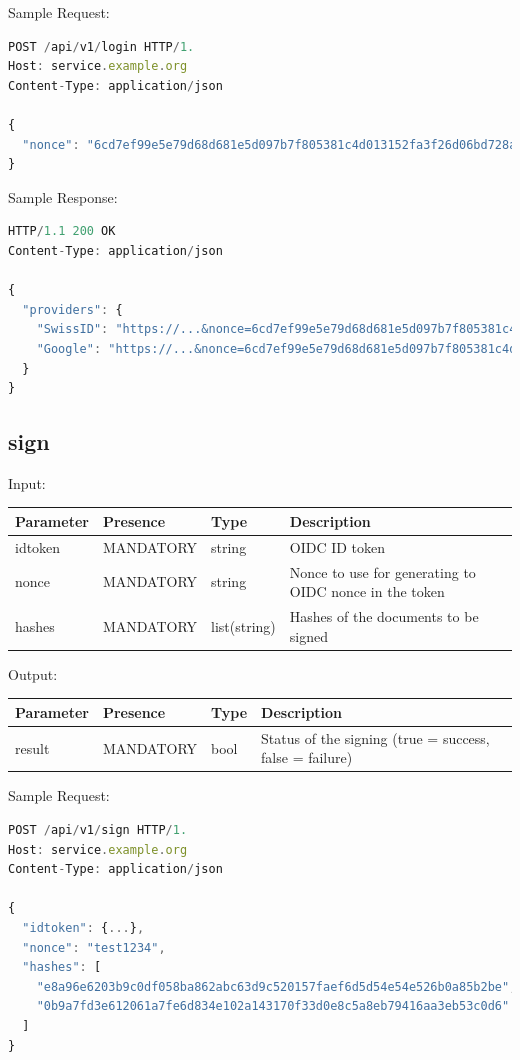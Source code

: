Sample Request:
\begin{lstlisting}[caption={login request}, captionpos=b, language=JavaScript, label={lst:loginrequest}]
POST /api/v1/login HTTP/1.
Host: service.example.org
Content-Type: application/json

{
  "nonce": "6cd7ef99e5e79d68d681e5d097b7f805381c4d013152fa3f26d06bd728ae49fa"
}
\end{lstlisting}

Sample Response:

\begin{lstlisting}[caption={login response}, captionpos=b, language=JavaScript, label={lst:loginresponse}]
HTTP/1.1 200 OK
Content-Type: application/json

{
  "providers": {
    "SwissID": "https://...&nonce=6cd7ef99e5e79d68d681e5d097b7f805381c4d013152fa3f26d06bd728ae49fa",
    "Google": "https://...&nonce=6cd7ef99e5e79d68d681e5d097b7f805381c4d013152fa3f26d06bd728ae49fa"
  }
}
\end{lstlisting}

\subsection{sign}
Input:

\begin{tabular}{|l|l|l|l|}
	\hline
	Parameter & Presence & Type & Description \\ \hline
	idtoken & MANDATORY & string & OIDC ID token \\ \hline
	nonce & MANDATORY & string & Nonce to use for generating to OIDC nonce in the token \\ \hline
	hashes & MANDATORY & list(string) & Hashes of the documents to be signed \\ \hline
\end{tabular}

Output:

\begin{tabular}{|l|l|l|l|}
	\hline
	Parameter & Presence & Type & Description \\ \hline
	result & MANDATORY & bool & Status of the signing (true = success, false = failure) \\ \hline
\end{tabular}

Sample Request:
\begin{lstlisting}[caption={sign request}, captionpos=b, language=JavaScript, label={lst:signrequest}]
POST /api/v1/sign HTTP/1.
Host: service.example.org
Content-Type: application/json

{
  "idtoken": {...},
  "nonce": "test1234",
  "hashes": [
    "e8a96e6203b9c0df058ba862abc63d9c520157faef6d5d54e54e526b0a85b2be",
    "0b9a7fd3e612061a7fe6d834e102a143170f33d0e8c5a8eb79416aa3eb53c0d6"
  ]
}
\end{lstlisting}

